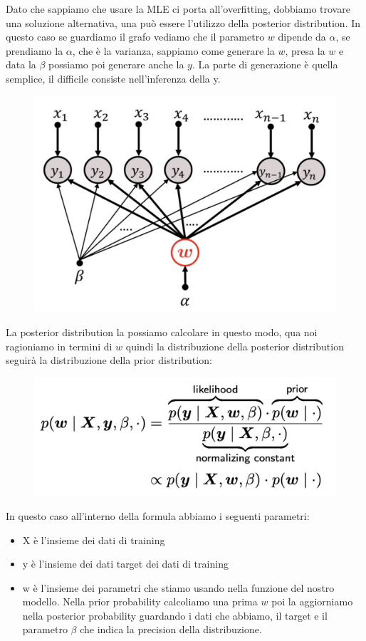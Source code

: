 \documentclass[14pt]{extreport}
\begin{document}
Dato che sappiamo che usare la MLE ci porta all'overfitting, dobbiamo trovare una soluzione alternativa, una può essere l'utilizzo della posterior
distribution. In questo caso se guardiamo il grafo vediamo che il parametro $w$ dipende da $\alpha$, se prendiamo la $\alpha$, che è la varianza,
sappiamo come generare la $w$, presa la $w$ e data la $\beta$ possiamo poi generare anche la $y$. La parte di generazione è quella semplice, il
difficile consiste nell'inferenza della y.


\begin{figure}[H]
\centering
\includegraphics[width=0.5\linewidth]{116.jpeg}
\end{figure}

La posterior distribution la possiamo calcolare in questo modo, qua noi ragioniamo in termini di $w$ quindi la distribuzione della posterior
distribution seguirà la distribuzione della prior distribution:
\begin{figure}[H]
\centering
\includegraphics[width=0.5\linewidth]{117.jpeg}
\end{figure}
In questo caso all'interno della formula abbiamo i seguenti parametri:
\begin{itemize}
\item X è l'insieme dei dati di training
\item y è l'insieme dei dati target dei dati di training
\item w è l'insieme dei parametri che stiamo usando nella funzione del nostro modello. Nella prior probability calcoliamo una prima $w$ poi la
aggiorniamo nella posterior probability guardando i dati che abbiamo, il target e il parametro $\beta$ che indica la precision della distribuzione.
\end{itemize}
\end{document}
